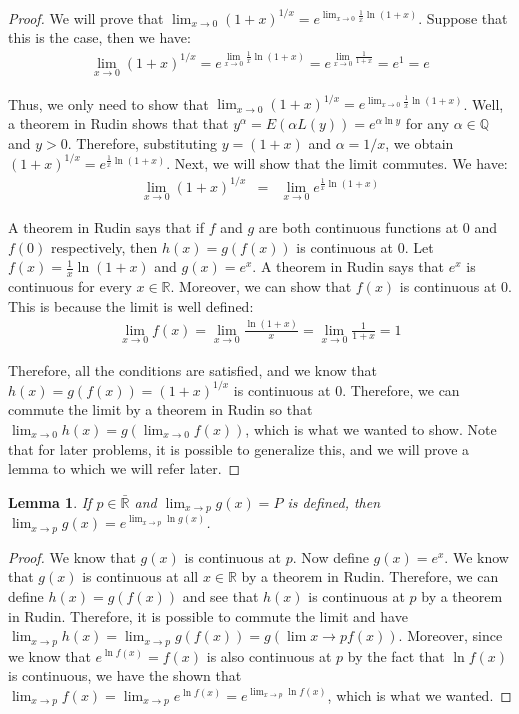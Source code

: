 \documentclass[psamsfonts]{amsart}
\newtheorem{lem}[thm]{Lemma}
\theoremstyle{definition}
\theoremstyle{remark}
\numberwithin{equation}{section}
\begin{document}
\begin{proof}
We will prove that $\lim_{x \to 0} (1+x)^{1/x} = e^{\lim_{x \to 0} \frac{1}{x} \ln (1+x)}$. Suppose that this is the case, then we have: 
\begin{eqnarray}
\lim_{x \to 0} (1+x)^{1/x} = e^{\lim_{x \to 0} \frac{1}{x} \ln(1+x)} = e^{\lim_{x \to 0} \frac{1}{1+x}} = e^1 = e
\end{eqnarray}

Thus, we only need to show that $\lim_{x \to 0} (1+x)^{1/x} = e^{\lim_{x \to 0} \frac{1}{x}\ln (1+x)}$. Well, a theorem in Rudin shows that that $y^{\alpha} = E(\alpha L(y)) = e^{\alpha \ln y}$ for any $\alpha \in \mathbb{Q}$ and $y > 0$. Therefore, substituting $y = (1+x)$ and $\alpha = 1/x$, we obtain $(1+x)^{1/x} = e^{\frac{1}{x} \ln(1+ x)}$. Next, we will show that the limit commutes. We have:
\begin{eqnarray}
\lim_{x \to 0} (1+x)^{1/x} &=& \lim_{x \to 0} e^{\frac{1}{x} \ln(1+ x)}
\end{eqnarray}

A theorem in Rudin says that if $f$ and $g$ are both continuous functions at $0$ and $f(0)$ respectively, then $h(x) = g(f(x))$ is continuous at $0$. Let $f(x) = \frac{1}{x} \ln(1+x)$ and $g(x) = e^x$. A theorem in Rudin says that $e^x$ is continuous for every $x \in \mathbb{R}$. Moreover, we can show that $f(x)$ is continuous at $0$. This is because the limit is well defined:
\begin{eqnarray}
\lim_{x \to 0} f(x) = \lim_{x \to 0} \frac{\ln(1+x)}{x} = \lim_{x \to 0} \frac{1}{1+x} = 1
\end{eqnarray}

Therefore, all the conditions are satisfied, and we know that $h(x) = g(f(x)) = (1+x)^{1/x}$ is continuous at $0$. Therefore, we can commute the limit by a theorem in Rudin so that $\lim_{x \to 0} h(x) = g( \lim_{x \to 0} f(x))$, which is what we wanted to show. Note that for later problems, it is possible to generalize this, and we will prove a lemma to which we will refer later.
\end{proof}

\begin{lem}
If $p \in \bar{\mathbb{R}}$ and $\lim_{x \to p} g(x) = P$ is defined, then $\lim_{x \to p} g(x) = e^{\lim_{x \to p} \ln g(x)}$. 
\end{lem}

\begin{proof}
We know that $g(x)$ is continuous at $p$. Now define $g(x) = e^x$. We know that $g(x)$ is continuous at all $x \in \mathbb{R}$ by a theorem in Rudin. Therefore, we can define $h(x) = g(f(x))$ and see that $h(x)$ is continuous at $p$ by a theorem in Rudin. Therefore, it is possible to commute the limit and have $\lim_{x \to p} h(x) = \lim_{x \to p} g(f(x)) = g(\lim{x \to p} f(x))$. Moreover, since we know that $e^{\ln f(x)} = f(x)$ is also continuous at $p$ by the fact that $\ln f(x)$ is continuous, we have the shown that $\lim_{x \to p} f(x) = \lim_{x \to p} e^{\ln f(x)} = e^{ \lim_{x \to p} \ln f(x)}$, which is what we wanted. 
\end{proof}
\end{document}
